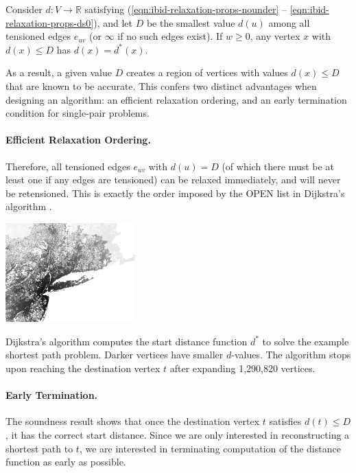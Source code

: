 \begin{theorem}
Consider $d: V \rightarrow \mathbb{R}$
satisfying (\ref{eqn:ibid-relaxation-props-nounder} --
\ref{eqn:ibid-relaxation-props-ds0}),
and let $D$ be the smallest value $d(u)$
among all tensioned edges $e_{uv}$
(or $\infty$ if no such edges exist).
If $w \geq 0$,
any vertex $x$ with $d(x) \leq D$
has $d(x) = d^*(x)$.
\label{thm:ibid-relaxation-sound}
\end{theorem}
As a result,
a given value $D$ creates a region of vertices
with values $d(x) \leq D$ that are known to be
accurate.
This confers two distinct advantages when designing an algorithm:
an efficient relaxation ordering,
and an early termination condition for single-pair problems.

\paragraph{Efficient Relaxation Ordering.}
Therefore,
all tensioned edges $e_{uv}$ with $d(u) = D$
(of which there must be at least one if any edges are tensioned)
can be relaxed immediately,
and will never be retensioned.
This is exactly the order imposed by the OPEN list in Dijkstra's
algorithm \citep{dijkstra1959anote}.

\begin{marginfigure}%
   \centering%
   \includegraphics[width=5cm]{figs/incbi-road-ne/singleshot/example-dijkstra.png}%
   \caption{Dijkstra's algorithm computes the start distance function
      $d^*$ to solve the example shortest path problem.
      Darker vertices have smaller $d$-values.
      The algorithm stops upon reaching the destination vertex $t$
      after expanding 1,290,820 vertices.}%
   \label{fig:ibid:example-distance}%
\end{marginfigure}

\paragraph{Early Termination.}
The soundness result shows that once the destination
vertex $t$ satisfies $d(t) \leq D$,
it has the correct start distance.
Since we are only interested in reconstructing a shortest path to $t$,
we are interested in terminating computation of the distance
function as early as possible.

